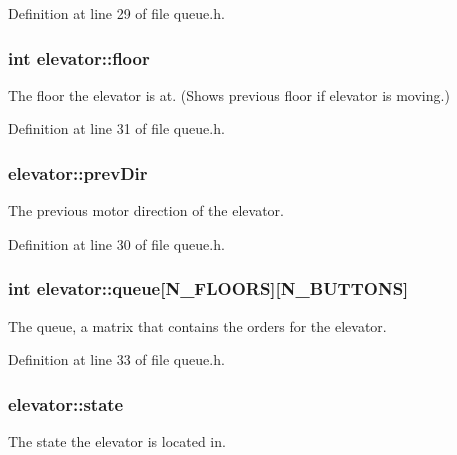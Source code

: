 Definition at line 29 of file queue.\+h.

\subsubsection[{\texorpdfstring{floor}{floor}}]{\setlength{\rightskip}{0pt plus 5cm}int elevator\+::floor}\hypertarget{structelevator_a53d264d5584d1d5796a6dc36d67240cf}{}\label{structelevator_a53d264d5584d1d5796a6dc36d67240cf}
The floor the elevator is at. (Shows previous floor if elevator is moving.) 

Definition at line 31 of file queue.\+h.

\subsubsection[{\texorpdfstring{prev\+Dir}{prevDir}}]{ elevator\+::prev\+Dir}\hypertarget{structelevator_a058f9c542d184cebcfdcd5b3370790ca}{}\label{structelevator_a058f9c542d184cebcfdcd5b3370790ca}
The previous motor direction of the elevator. 

Definition at line 30 of file queue.\+h.

\subsubsection[{\texorpdfstring{queue}{queue}}]{\setlength{\rightskip}{0pt plus 5cm}int elevator\+::queue\mbox{[}N\+\_\+\+F\+L\+O\+O\+RS\mbox{]}\mbox{[}N\+\_\+\+B\+U\+T\+T\+O\+NS\mbox{]}}\hypertarget{structelevator_a64efa739ce2fff3d9ec918196a1ecf13}{}\label{structelevator_a64efa739ce2fff3d9ec918196a1ecf13}
The queue, a matrix that contains the orders for the elevator. 

Definition at line 33 of file queue.\+h.

\subsubsection[{\texorpdfstring{state}{state}}]{ elevator\+::state}\hypertarget{structelevator_ace035615f55707c52cf604a135917b0a}{}\label{structelevator_ace035615f55707c52cf604a135917b0a}
The state the elevator is located in. 


